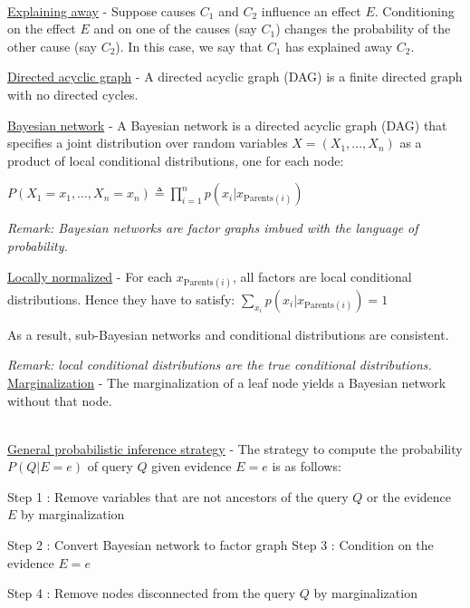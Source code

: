 \documentclass[4pt,landscape]{article}
\begin{document}
\begin{multicols*}{4}
 {\color{magenta} \hrulefill}\\
 {\tiny \underline{Explaining away} - Suppose causes $C_1$ and $C_2$ influence an effect $E$. Conditioning on the effect $E$ and on one of the causes (say $C_1$) changes the probability of the other cause (say $C_2$). In this case, we say that $C_1$ has explained away $C_2$.}\par
 {\tiny \underline{Directed acyclic graph} - A directed acyclic graph (DAG) is a finite directed graph with no directed cycles.}\par
 {\tiny \underline{Bayesian network} - A Bayesian network is a directed acyclic graph (DAG) that specifies a joint distribution over random variables $X=(X_1,...,X_n)$ as a product of local conditional distributions, one for each node:}\par
 {\tiny $P(X_1=x_1,...,X_n=x_n)\triangleq\prod_{i=1}^np(x_i|x_{\textrm{Parents}(i)})$}\par
 {\tiny \textit{Remark: Bayesian networks are factor graphs imbued with the language of probability.}}\par
 {\tiny \underline{Locally normalized} - For each $x_{\textrm{Parents}(i)}$, all factors are local conditional distributions. Hence they have to satisfy: $\sum_{x_i}p(x_i|x_{\textrm{Parents}(i)})=1$}\par
 {As a result, sub-Bayesian networks and conditional distributions are consistent.}\par
 {\tiny \textit{Remark: local conditional distributions are the true conditional distributions.}}
 {\tiny \underline{Marginalization} - The marginalization of a leaf node yields a Bayesian network without that node.}\par
 {\color{magenta} \hrulefill}\\
 {\tiny \underline{General probabilistic inference strategy} - The strategy to compute the probability $P(Q | E=e)$ of query $Q$ given evidence $E=e$ is as follows:}\par
 {\tiny \textrm{Step 1} : Remove variables that are not ancestors of the query $Q$ or the evidence $E$ by marginalization}\par
 {\tiny \textrm{Step 2} : Convert Bayesian network to factor graph  \textrm{Step 3} : Condition on the evidence $E=e$}\par
 {\tiny \textrm{Step 4} : Remove nodes disconnected from the query $Q$ by marginalization}\par

\end{multicols*}
\end{document}
